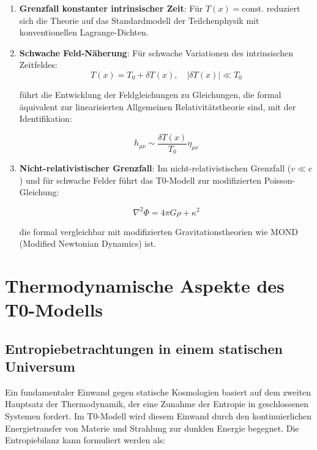 \documentclass[a4paper,12pt]{article}
\theoremstyle{definition}
\theoremstyle{remark}
\newcommand{\Tfield}{T(x)} %
\begin{document}
	\begin{enumerate}
		\item \textbf{Grenzfall konstanter intrinsischer Zeit}: Für $\Tfield = \text{const.}$ reduziert sich die Theorie auf das Standardmodell der Teilchenphysik mit konventionellen Lagrange-Dichten.
		
		\item \textbf{Schwache Feld-Näherung}: Für schwache Variationen des intrinsischen Zeitfeldes:
		\begin{equation}
			\Tfield = T_0 + \delta \Tfield, \quad |\delta \Tfield| \ll T_0
		\end{equation}
		
		führt die Entwicklung der Feldgleichungen zu Gleichungen, die formal äquivalent zur linearisierten Allgemeinen Relativitätstheorie sind, mit der Identifikation:
		
		\begin{equation}
			h_{\mu\nu} \sim \frac{\delta \Tfield}{T_0} \eta_{\mu\nu}
		\end{equation}
		
		\item \textbf{Nicht-relativistischer Grenzfall}: Im nicht-relativistischen Grenzfall ($v \ll c$) und für schwache Felder führt das T0-Modell zur modifizierten Poisson-Gleichung:
		
		\begin{equation}
			\nabla^2 \Phi = 4\pi G \rho + \kappa^2
		\end{equation}
		
		die formal vergleichbar mit modifizierten Gravitationstheorien wie MOND (Modified Newtonian Dynamics) ist.
	\end{enumerate}
	
	\section{Thermodynamische Aspekte des T0-Modells}
	
	\subsection{Entropiebetrachtungen in einem statischen Universum}
	
	Ein fundamentaler Einwand gegen statische Kosmologien basiert auf dem zweiten Hauptsatz der Thermodynamik, der eine Zunahme der Entropie in geschlossenen Systemen fordert. Im T0-Modell wird diesem Einwand durch den kontinuierlichen Energietransfer von Materie und Strahlung zur dunklen Energie begegnet. Die Entropiebilanz kann formuliert werden als:
	
\end{document}
